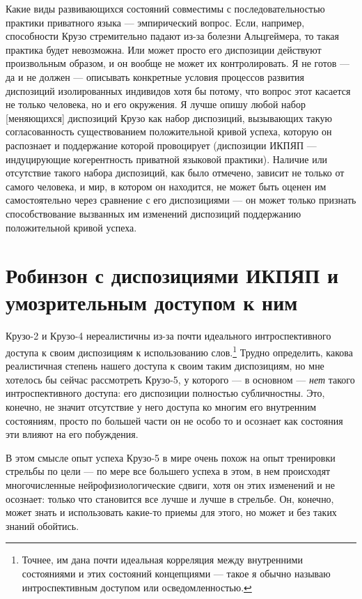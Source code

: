 \documentclass[11pt]{book}
\begin{document}
Какие виды развивающихся состояний совместимы с последовательностью практики приватного языка --- эмпирический вопрос. Если, например, способности Крузо стремительно падают из-за болезни Альцгеймера, то такая практика будет невозможна. Или может просто его диспозиции действуют произвольным образом, и он вообще не может их контролировать. Я не готов --- да и не должен --- описывать конкретные условия процессов развития диспозиций изолированных индивидов хотя бы потому, что вопрос этот касается не только человека, но и его окружения. Я лучше опишу любой набор [меняющихся] диспозиций Крузо как набор диспозиций, вызывающих такую согласованность существованием положительной кривой успеха, которую он распознает и поддержание которой провоцирует (диспозиции ИКПЯП --- индуцирующие когерентность приватной языковой практики). Наличие или отсутствие такого набора диспозиций, как было отмечено, зависит не только от самого человека, и мир, в котором он находится, не может быть оценен им самостоятельно через сравнение с его диспозициями --- он может только признать способствование вызванных им изменений диспозиций поддержанию положительной кривой успеха.

\section{Робинзон с диспозициями ИКПЯП и умозрительным доступом к ним}

Крузо-2 и Крузо-4 нереалистичны из-за почти идеального интроспективного доступа к своим диспозициям к использованию слов.\footnote{Точнее, им дана почти идеальная корреляция между внутренними состояниями и этих состояний концепциями --- такое я обычно называю интроспективным доступом или осведомленностью.} Трудно определить, какова реалистичная степень нашего доступа к своим таким диспозициям, но мне хотелось бы сейчас рассмотреть Крузо-5, у которого --- в основном --- \textit{нет} такого интроспективного доступа: его диспозиции полностью субличностны. Это, конечно, не значит отсутствие у него доступа ко многим его внутренним состояниям, просто по большей части он не особо то и осознает как состояния эти влияют на его побуждения.

В этом смысле опыт успеха Крузо-5 в мире очень похож на опыт тренировки стрельбы по цели --- по мере все большего успеха в этом, в нем происходят многочисленные нейрофизиологические сдвиги, хотя он этих изменений и не осознает: только что становится все лучше и лучше в стрельбе. Он, конечно, может знать и использовать какие-то приемы для этого, но может и без таких знаний обойтись.
\end{document}
